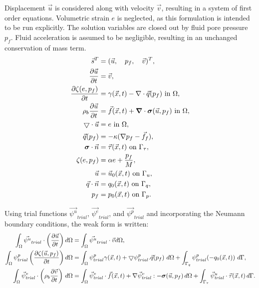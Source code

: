 Displacement $\vec{u}$ is considered along with velocity $\vec{v}$, resulting 
in a system of first order equations. Volumetric strain $e$ is neglected, as 
this formulation is intended to be run explicitly. The solution variables are 
closed out by fluid pore pressure $p_f$. Fluid acceleration is assumed to be 
negligible, resulting in an unchanged conservation of mass term.\\

\begin{align}
  \vec{s}^T &= (\vec{u},\quad p_f, \quad \vec{v})^T, \\
  \frac{\partial \vec{u}}{\partial t} &= \vec{v}, \\
  \frac{\partial \zeta(e,p_f)}{\partial t} &= \gamma(\vec{x},t) - \nabla \cdot 
  \vec{q}(p_f) \text{ in } \Omega, \\
  \rho_{b}\frac{\partial \vec{u}}{\partial t} &= \vec{f}(\vec{x},t) + 
  \bm{\nabla} \cdot \bm{\sigma}(\vec{u},p_f) 
  \text{ in }\Omega, \\
  \bigtriangledown \cdot \vec{u} &= e \text{ in } \Omega, \\
  \vec{q}(p_f) &= -\kappa (\nabla p_f - \vec{f}_f), \\
  \bm{\sigma} \cdot \vec{n} &= \vec{\tau}(\vec{x},t) \text{ on }\Gamma_\tau, 
  \\
  \zeta(e,p_f) &= \alpha e + \frac{p_f}{M}, \\
  \vec{u} &= \vec{u}_0(\vec{x},t) \text{ on }\Gamma_u, \\
  \vec{q} \cdot \vec{n} &= q_0(\vec{x},t) \text{ on }\Gamma_q, \\
  p_f &= p_0(\vec{x},t) \text{ on }\Gamma_p.
\end{align}

Using trial functions $\vec{\psi^u}_{trial}$, $\vec{\psi^e}_{trial}$, and 
$\vec{\psi^p}_{trial}$ and incorporating the Neumann boundary conditions, the 
weak form is written: \\

\begin{align}
 \int_{\Omega} \vec{\psi^u}_{trial} \cdot \left( \frac{\partial 
\vec{u}}{\partial t} \right) d \Omega &= \int_{\Omega} \vec{\psi^u}_{trial}\cdot 
\vec{v} d \Omega, \\
%
 \int_{\Omega} \psi_{trial}^p \left( \frac{\partial \zeta 
(\vec{u},p_f)}{\partial t} \right) d\Omega &=
 \int_{\Omega} \psi_{trial}^p 
\gamma(\vec{x},t) + \bigtriangledown \psi_{trial}^p . \vec{q}(p_f) \ d\Omega + 
\int_{\Gamma_q} \psi_{trial}^p (-q_0(\vec{x},t)) \ d\Gamma, \\
%
  \int_\Omega \trialvec[v] \cdot \left( \rho_{b} \frac{\partial 
\vec{v}}{\partial t} \right) \, 
d\Omega &=
  \int_\Omega \trialvec[v] \cdot \vec{f}(\vec{x},t) + \nabla \trialvec[v] : 
-\tensor{\sigma} (\vec{u},p_f) \, d\Omega + \int_{\Gamma_\tau} \trialvec[u] 
\cdot \vec{\tau}(\vec{x},t) \, d\Gamma.
\end{align}

